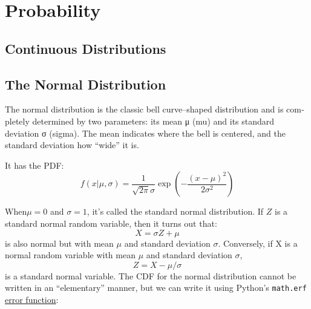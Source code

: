 \chapter{Probability}
\section{Continuous Distributions}

\section{The Normal Distribution}
The normal distribution is the classic bell curve–shaped distribution and is com‐
pletely determined by two parameters: its mean μ (mu) and its standard deviation σ
(sigma). The mean indicates where the bell is centered, and the standard deviation
how “wide” it is.

It has the PDF:
\begin{equation*}
    f(x|\mu, \sigma)=\frac{1}{\sqrt{2\pi}\sigma}\exp(-
    \frac{(x-\mu)^2}{2\sigma^2})
\end{equation*}

When$\mu = 0$ and $\sigma = 1$, it’s called the standard normal distribution. If $Z$ is a standard
normal random variable, then it turns out that:
$$X = \sigma Z + \mu$$
is also normal but with mean $\mu$ and standard deviation $\sigma$. Conversely, if X is a normal
random variable with mean $\mu$ and standard deviation $\sigma$,
$$Z = X - \mu /\sigma$$
is a standard normal variable.
The CDF for the normal distribution cannot be written in an “elementary” manner,
but we can write it using Python’s \verb|math.erf| \href{https://en.wikipedia.org/wiki/Error_function}{error function}: